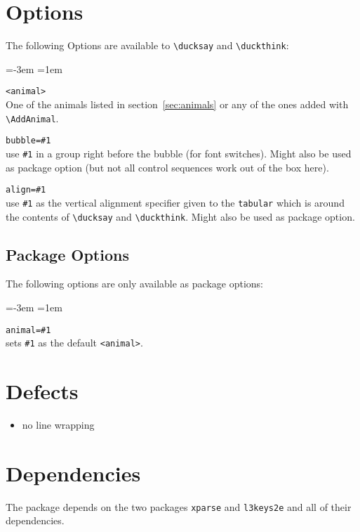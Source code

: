 \documentclass[]{article}
\newcommand*{\anml}{\texttt{<animal>}}
\newenvironment{codedescription}{%
  \parindent=-3em%
  \parskip=1em%
  \par%
}{}
\begin{document}
\section{Options}\label{sec:options}
{\reversemarginpar{}}
The following Options are available to \verb|\ducksay| and \verb|\duckthink|:

\begin{codedescription}
\anml\\
  One of the animals listed in section~\ref{sec:animals} or any of the ones
  added with \verb|\AddAnimal|.

\texttt{bubble=\#1}\\
  use \texttt{\#1} in a group right before the bubble (for font switches). Might
  also be used as package option (but not all control sequences work out of the
  box here).

\texttt{align=\#1}\\
  use \texttt{\#1} as the vertical alignment specifier given to the
  \texttt{tabular} which is around the contents of \verb|\ducksay| and
  \verb|\duckthink|. Might also be used as package option.
\end{codedescription}
  
\subsection{Package Options}
The following options are only available as package options:

\begin{codedescription}
\texttt{animal=\#1}\\
  sets \texttt{\#1} as the default \anml.
\end{codedescription}

\section{Defects}
{\reversemarginpar{}}
\begin{itemize}
  \item no line wrapping
\end{itemize}

\section{Dependencies}
The package depends on the two packages \texttt{xparse} and \texttt{l3keys2e}
and all of their dependencies.
\end{document}
